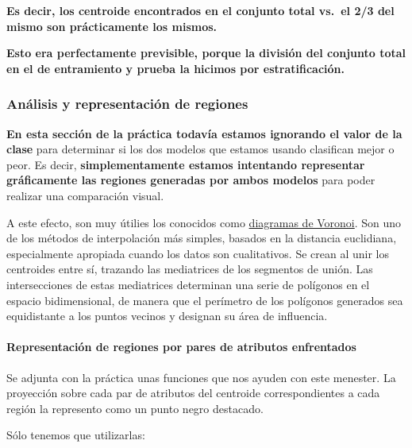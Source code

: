 \documentclass[11pt]{article}
\begin{document}
\textbf{Es decir, los centroide encontrados en el conjunto total vs.~el
2/3 del mismo son prácticamente los mismos.}

\textbf{Esto era perfectamente previsible, porque la división del
conjunto total en el de entramiento y prueba la hicimos por
estratificación.}

    \subsubsection{Análisis y representación de
regiones}\label{anuxe1lisis-y-representaciuxf3n-de-regiones}

\textbf{En esta sección de la práctica todavía estamos ignorando el
valor de la clase} para determinar si los dos modelos que estamos usando
clasifican mejor o peor. Es decir, \textbf{simplementamente estamos
intentando representar gráficamente las regiones generadas por ambos
modelos} para poder realizar una comparación visual.

A este efecto, son muy útilies los conocidos como
\href{https://en.wikipedia.org/wiki/Voronoi_diagram}{diagramas de
Voronoi}. Son uno de los métodos de interpolación más simples, basados
en la distancia euclidiana, especialmente apropiada cuando los datos son
cualitativos. Se crean al unir los centroides entre sí, trazando las
mediatrices de los segmentos de unión. Las intersecciones de estas
mediatrices determinan una serie de polígonos en el espacio
bidimensional, de manera que el perímetro de los polígonos generados sea
equidistante a los puntos vecinos y designan su área de influencia.

\paragraph{Representación de regiones por pares de atributos
enfrentados}\label{representaciuxf3n-de-regiones-por-pares-de-atributos-enfrentados}

Se adjunta con la práctica unas funciones que nos ayuden con este
menester. La proyección sobre cada par de atributos del centroide
correspondientes a cada región la represento como un punto negro
destacado.

Sólo tenemos que utilizarlas:
\end{document}

